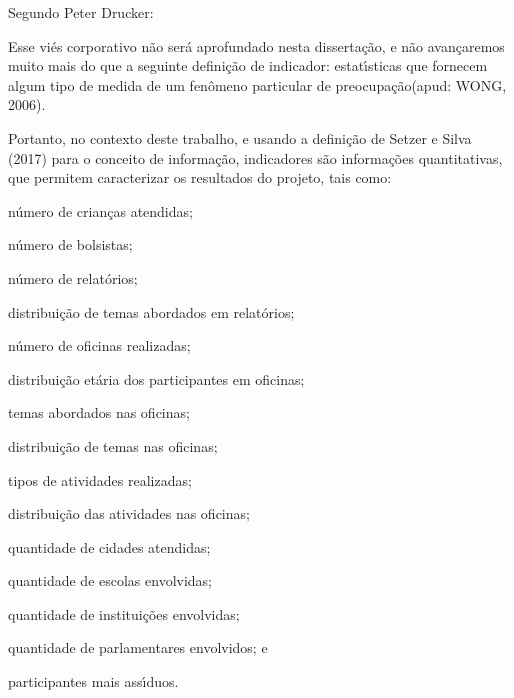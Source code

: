 \documentclass[
12pt,		%
openright,	%
twoside,  %
a4paper,			%
chapter=TITLE,		%
english,			%
french,				%
spanish,			%
brazil				%
]{USPSC-classe/USPSC}
\begin{document}
Segundo Peter Drucker:









\noindent\begin{center}\mbox{\centering{}}\end{center}


Esse vi\'es corporativo n\~ao ser\'a aprofundado nesta disserta\c{c}\~ao, e n\~ao avan\c{c}aremos muito mais do que a seguinte defini\c{c}\~ao de indicador: \textquotedbl estat\'{\i}sticas que fornecem algum tipo de medida de um fen\^omeno particular de preocupa\c{c}\~ao\textquotedbl  (apud: WONG, 2006).








Portanto, no contexto deste trabalho, e usando a defini\c{c}\~ao de  Setzer e Silva (2017) para o conceito de \textquotedbl informa\c{c}\~ao\textquotedbl , indicadores s\~ao informa\c{c}\~oes quantitativas, que permitem caracterizar os resultados do projeto, tais como:









\begin{alineas}
\item n\'umero de crian\c{c}as atendidas;
\item n\'umero de bolsistas;
\item n\'umero de relat\'orios;
\item distribui\c{c}\~ao de temas abordados em relat\'orios;
\item n\'umero de oficinas realizadas;
\item distribui\c{c}\~ao et\'aria dos participantes em oficinas;
\item temas abordados nas oficinas;
\item distribui\c{c}\~ao de temas nas oficinas;
\item tipos de atividades realizadas;
\item distribui\c{c}\~ao das atividades nas oficinas;
\item quantidade de cidades atendidas;
\item quantidade de escolas envolvidas;
\item quantidade de institui\c{c}\~oes envolvidas;
\item quantidade de parlamentares envolvidos; e
\item participantes mais ass\'{\i}duos.
\end{alineas}
\end{document}

